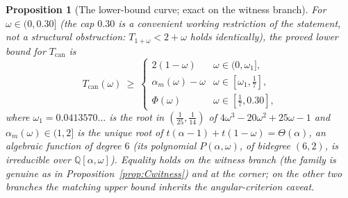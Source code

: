 \documentclass[11pt]{article}
\newtheorem{proposition}[theorem]{Proposition}
\theoremstyle{definition}
\begin{document}
\begin{proposition}[The lower-bound curve; exact on the witness
branch]\label{prop:Ccurve}
For $\omega\in(0,0.30]$ (the cap $0.30$ is a convenient working
restriction of the statement, not a structural obstruction:
$T_{1+\omega}<2+\omega$ holds identically), the proved lower bound for
$T_{\mathrm{can}}$ is
\[
T_{\mathrm{can}}(\omega)\ \ge\
\begin{cases}
2(1-\omega) & \omega\in(0,\omega_1],\\[2pt]
\alpha_m(\omega)-\omega & \omega\in[\omega_1,\tfrac17],\\[2pt]
\Phi(\omega) & \omega\in[\tfrac17,0.30],
\end{cases}
\]
where $\omega_1=0.0413570\dots$ is the root in
$(\tfrac1{25},\tfrac1{14})$ of $4\omega^3-20\omega^2+25\omega-1$ and
$\alpha_m(\omega)\in(1,2]$ is the unique root of
$t(\alpha-1)+t(1-\omega)=\Theta(\alpha)$, an algebraic function of degree
$6$ (its polynomial $P(\alpha,\omega)$, of bidegree $(6,2)$, is
irreducible over $\mathbb Q[\alpha,\omega]$). Equality holds on the witness
branch (the family is genuine as in Proposition~\ref{prop:Cwitness}) and at
the corner; on the other two branches the matching upper
bound inherits the angular-criterion caveat.
\end{proposition}
\end{document}
